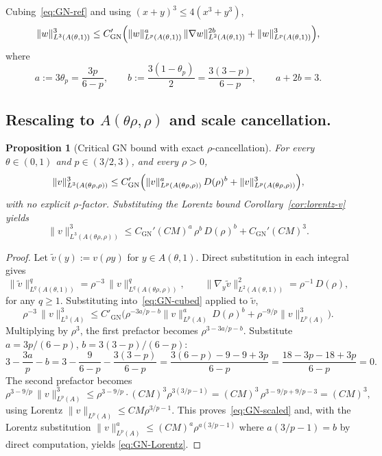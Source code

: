 \documentclass[11pt]{amsart}
\newtheorem{proposition}[theorem]{Proposition}
\theoremstyle{definition}
\newcommand{\DD}{D}              %
\newcommand{\norm}[1]{\|#1\|}
\begin{document}
Cubing~\eqref{eq:GN-ref} and using $(x + y)^3 \leq 4(x^3 + y^3)$,
\begin{equation}\label{eq:GN-cubed}
\norm{w}_{L^3(A(\theta,1))}^3 \leq C'_{\mathrm{GN}}\Bigl(
\norm{w}_{L^p(A(\theta,1))}^a\,\norm{\nabla w}_{L^2(A(\theta,1))}^{2b}
+ \norm{w}_{L^p(A(\theta,1))}^3 \Bigr),
\end{equation}
where
\[
a := 3\theta_p = \frac{3p}{6 - p}, \qquad
b := \frac{3(1 - \theta_p)}{2} = \frac{3(3 - p)}{6 - p}, \qquad
a + 2b = 3.
\]

\subsection{Rescaling to $A(\theta\rho, \rho)$ and scale cancellation.}

\begin{proposition}[Critical GN bound with exact $\rho$-cancellation]
\label{prop:GN-critical}
For every $\theta \in (0, 1)$ and $p \in (3/2, 3)$, and every
$\rho > 0$,
\begin{equation}\label{eq:GN-scaled}
\norm{v}_{L^3(A(\theta\rho, \rho))}^3
\leq C'_{\mathrm{GN}} \Bigl(
\norm{v}_{L^p(A(\theta\rho, \rho))}^a\, \DD(\rho)^b
+ \norm{v}_{L^p(A(\theta\rho, \rho))}^3 \Bigr),
\end{equation}
with no explicit $\rho$-factor. Substituting the Lorentz bound
Corollary~\ref{cor:lorentz-v} yields
\begin{equation}\label{eq:GN-Lorentz}
\norm{v}_{L^3(A(\theta\rho, \rho))}^3 \leq
C_{\mathrm{GN}}'(CM)^a\,\rho^b\, \DD(\rho)^b + C_{\mathrm{GN}}'(CM)^3.
\end{equation}
\end{proposition}

\begin{proof}
Let $\tilde v(y) := v(\rho y)$ for $y \in A(\theta, 1)$. Direct
substitution in each integral gives
\[
\norm{\tilde v}_{L^q(A(\theta,1))}^q = \rho^{-3}\,\norm{v}_{L^q(A(\theta\rho,\rho))}^q,
\qquad
\norm{\nabla_y \tilde v}_{L^2(A(\theta,1))}^2 = \rho^{-1}\,\DD(\rho),
\]
for any $q \geq 1$. Substituting into~\eqref{eq:GN-cubed} applied
to $\tilde v$,
\[
\rho^{-3}\,\norm{v}_{L^3(A)}^3
\leq C'_{\mathrm{GN}}\bigl(
\rho^{-3a/p - b}\norm{v}_{L^p(A)}^a\,\DD(\rho)^b
+ \rho^{-9/p}\norm{v}_{L^p(A)}^3
\bigr).
\]
Multiplying by $\rho^3$, the first prefactor becomes
$\rho^{3 - 3a/p - b}$. Substitute $a = 3p/(6 - p)$, $b = 3(3 - p)/(6 - p)$:
\[
3 - \frac{3a}{p} - b
= 3 - \frac{9}{6-p} - \frac{3(3 - p)}{6 - p}
= \frac{3(6-p) - 9 - 9 + 3p}{6 - p}
= \frac{18 - 3p - 18 + 3p}{6 - p} = 0.
\]
The second prefactor becomes
\[
\rho^{3 - 9/p}\,\norm{v}_{L^p(A)}^3 \leq
\rho^{3 - 9/p}\cdot(CM)^3\rho^{3(3/p - 1)}
= (CM)^3\,\rho^{3 - 9/p + 9/p - 3} = (CM)^3,
\]
using Lorentz $\norm{v}_{L^p(A)} \leq CM\rho^{3/p - 1}$. This
proves~\eqref{eq:GN-scaled} and, with the Lorentz substitution
$\norm{v}_{L^p(A)}^a \leq (CM)^a \rho^{a(3/p - 1)}$ where
$a(3/p - 1) = b$ by direct computation, yields
\eqref{eq:GN-Lorentz}.
\end{proof}
\end{document}
